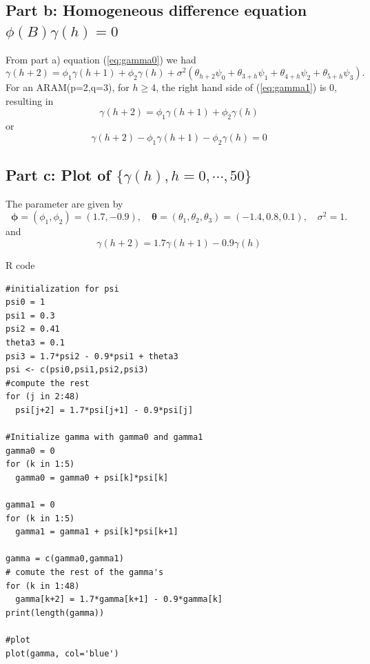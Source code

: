 \documentclass[11pt, oneside]{article}   	%
\begin{document}
\subsection{Part b: Homogeneous difference equation $\phi(B)\gamma(h)=0$}
From part a) equation (\ref{eq:gamma0}) we had 
\begin{equation}\label{eq:gamma1}
\gamma(h+2) = \phi_{1}\gamma(h+1) + \phi_{2}\gamma(h) + \sigma^{2}(\theta_{h+2}\psi_{0} + \theta_{3+h}\psi_{1} + \theta_{4+h}\psi_{2}+\theta_{5+h}\psi_{3} ).
\end{equation}
For an ARAM(p=2,q=3), for $h\geq 4$, the right hand side of (\ref{eq:gamma1}) is 0, resulting in 
\begin{equation}\label{eq:gamma2}
\gamma(h+2) = \phi_{1}\gamma(h+1) + \phi_{2}\gamma(h) 
\end{equation}
or 
\begin{equation}\label{eq:gamma3}
\gamma(h+2)-\phi_{1}\gamma(h+1)-\phi_{2}\gamma(h)  = 0
\end{equation}

\subsection{Part c: Plot of $\{ \gamma(h), h = 0 , \cdots,50  \}$ }
The parameter are given by 
\begin{equation}\label{eq:params1}
\bm{\phi} = (\phi_{1}, \phi_{2}) = (1.7, -0.9), \quad \bm{\theta} = (\theta_{1}, \theta_{2}, \theta_{3}) = (-1.4, 0.8, 0.1) ,\quad \sigma^{2} = 1 .
\end{equation}
and 
\begin{equation}\label{eq:gamma22}
\gamma(h+2) = 1.7\gamma(h+1) -0.9\gamma(h) 
\end{equation}

\clearpage
R code 
\begin{lstlisting}
#initialization for psi
psi0 = 1
psi1 = 0.3
psi2 = 0.41
theta3 = 0.1
psi3 = 1.7*psi2 - 0.9*psi1 + theta3
psi <- c(psi0,psi1,psi2,psi3)
#compute the rest
for (j in 2:48)
  psi[j+2] = 1.7*psi[j+1] - 0.9*psi[j]

#Initialize gamma with gamma0 and gamma1
gamma0 = 0
for (k in 1:5)
  gamma0 = gamma0 + psi[k]*psi[k]

gamma1 = 0
for (k in 1:5)
  gamma1 = gamma1 + psi[k]*psi[k+1]

gamma = c(gamma0,gamma1)
# comute the rest of the gamma's
for (k in 1:48)
  gamma[k+2] = 1.7*gamma[k+1] - 0.9*gamma[k]
print(length(gamma))

#plot
plot(gamma, col='blue')
\end{lstlisting}
\end{document}

